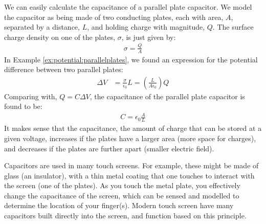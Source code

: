 We can easily calculate the capacitance of a parallel plate capacitor. We model the capacitor as being made of two conducting plates, each with area, $A$, separated by a distance, $L$, and holding charge with magnitude, $Q$. The surface charge density on one of the plates, $\sigma$, is just given by:
\begin{align*}
\sigma =\frac{Q}{A}
\end{align*} 
In Example \ref{ex:potential:parallelplates}, we found an expression for the potential difference between two parallel plates:
\begin{align*}
\Delta V &= \frac{\sigma}{\epsilon_0}L=\left(\frac{L}{A\epsilon_0}\right)Q
\end{align*}
Comparing with, $Q=C\Delta V$, the capacitance of the parallel plate capacitor is found to be:
\begin{align*}
C=\epsilon_0\frac{A}{L}
\end{align*}
It makes sense that the capacitance, the amount of charge that can be stored at a given voltage, increases if the plates have a larger area (more space for charges), and decreases if the plates are further apart (smaller electric field).

Capacitors are used in many touch screens. For example, these might be made of glass (an insulator), with a thin metal coating that one touches to interact with the screen (one of the plates). As you touch the metal plate, you effectively change the capacitance of the screen, which can be sensed and modelled to determine the location of your finger(s). Modern touch screen have many capacitors built directly into the screen, and function based on this principle. 

